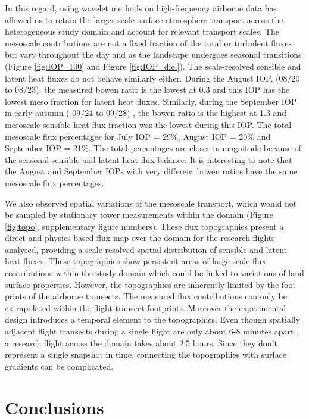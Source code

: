 \documentclass[draft]{agujournal2019}
\begin{document}
In this regard, using wavelet methods on high-frequency airborne data has allowed us to retain the larger scale surface-atmosphere transport across the heterogeneous study domain and account for relevant transport scales. The mesoscale contributions are not a fixed fraction of the total or turbulent fluxes but vary throughout the day and as the landscape undergoes seasonal transitions (Figure \ref{fig:IOP_100} and Figure \ref{fig:IOP_diel}). The scale-resolved sensible and latent heat fluxes do not behave similarly either. During the August IOP, (08/20 to 08/23), the measured bowen ratio is the lowest at 0.3 and this IOP has the lowest meso fraction for latent heat fluxes. Similarly, during the September IOP in early autumn ( 09/24 to 09/28) , the bowen ratio is the highest at 1.3 and mesoscale sensible heat flux fraction was the lowest during this IOP. The total mesoscale flux percentages for July IOP = 29\%, August IOP = 20\% and September IOP = 21\%. The total percentages are closer in magnitude because of the seasonal sensible and latent heat flux balance.  It is interesting to note that the August and September IOPs with very different bowen ratios have the same mesoscale flux percentages.

We also observed spatial variations of the mesoscale transport, which would not be sampled by stationary tower measurements within the domain (Figure \ref{fig:topo}, supplementary figure numbers). These flux topographies present a direct and physics-based flux map over the domain for the research flights analysed, providing a scale-resolved spatial distribution of sensible and latent heat fluxes. These topographies show persistent areas of large scale flux contributions within the study domain which could be linked to variations of land surface properties. However, the topographies are inherently limited by the foot prints of the airborne transects. The measured flux contributions can only be extrapolated within the flight transect footprints. Moreover the experimental design introduces a temporal element to the topographies. Even though spatially adjacent flight transects during a single flight are only about 6-8 minutes apart , a research flight across the domain takes about 2.5 hours. Since they don't represent a single snapshot in time, connecting the topographies with surface gradients can be complicated.

\section{Conclusions}
\end{document}
